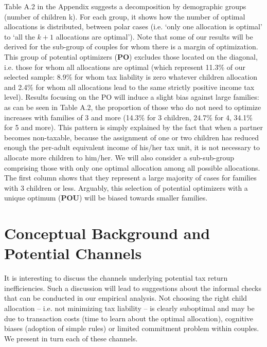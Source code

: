 Table A.2 in the Appendix suggests a decomposition by demographic groups (number of children k). For each group, it shows how the number of optimal allocations is distributed, between polar cases (i.e. `only one allocation is optimal’ to `all the $k+1$ allocations are optimal’). Note that some of our results will be derived for the sub-group of couples for whom there is a margin of optimization. This group of potential optimizers (\textbf{PO}) excludes those located on the diagonal, i.e. those for whom all allocations are optimal (which represent 11.3\% of our selected sample: 8.9\% for whom tax liability is zero whatever children allocation and 2.4\% for whom all allocations lead to the same strictly positive income tax level). Results focusing on the PO will induce a slight bias against large families: as can be seen in Table A.2, the proportion of those who do not need to optimize increases with families of 3 and more (14.3\% for 3 children, 24.7\% for 4, 34.1\% for 5 and more). This pattern is simply explained by the fact that when a partner becomes non-taxable, because the assignment of one or two children has reduced enough the per-adult equivalent income of his/her tax unit, it is not necessary to allocate more children to him/her. We will also consider a sub-sub-group comprising those with only one optimal allocation among all possible allocations. The first column shows that they represent a large majority of cases for families with 3 children or less. Arguably, this selection of potential optimizers with a unique optimum (\textbf{POU}) will be biased towards smaller families.

\section{Conceptual Background and Potential Channels}\label{sec:section_4}

It is interesting to discuss the channels underlying potential tax return inefficiencies. Such a discussion will lead to suggestions about the informal checks that can be conducted in our empirical analysis. Not choosing the right child allocation – i.e. not minimizing tax liability – is clearly suboptimal and may be due to transaction costs (time to learn about the optimal allocation), cognitive biases (adoption of simple rules) or limited commitment problem within couples. We present in turn each of these channels.

